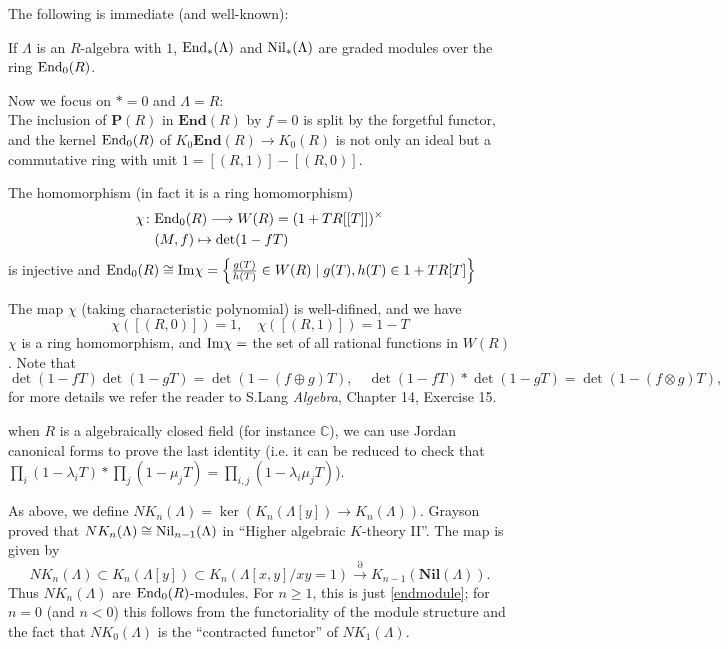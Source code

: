 The following is immediate (and well-known):
\begin{prop}\label{endmodule}
	If  $\Lambda$ is an $R$-algebra with $1$, $\mathrm{End}_*(\Lambda)$ and
$\mathrm{Nil}_*(\Lambda)$ are graded modules over the ring $\mathrm{End}_0 (R)$.
\end{prop}
Now we focus on $*=0$ and $\Lambda =R$:\\

The inclusion of $\mathbf{P}(R)$ in $\mathbf{End}(R)$ by $f = 0$ is split by the forgetful functor, and the kernel $\mathrm{End}_0 (R)$ of $K_0\mathbf{End}(R) \longrightarrow K_0 (R)$ is not only an ideal but a commutative ring with unit $1 = [(R,1)] - [(R, 0)]$.

\begin{theorem}[Almkvist]\label{Almkvist}
The homomorphism (in fact it is a ring homomorphism)
\begin{align*}
	\chi \colon&  \mathrm{End}_0(R)\longrightarrow W(R)=(1+TR[[T]])^{\times}\\
     & (M,f) \mapsto \det(1-fT)
\end{align*}
	is injective and $\mathrm{End}_0(R)\cong \mathrm{Im} \chi =\left\{\frac{g(T)}{h(T)}\in W(R)\mid g(T),h(T) \in 1+TR[T]\right\}$
\end{theorem}
The map $\chi$ (taking characteristic polynomial) is well-difined, and we have 
\[\chi([(R,0)])=1, \quad \chi([(R,1)])=1-T\]
$\chi$ is a ring homomorphism, and $\mathrm{Im} \chi =$ the set of all rational functions in $W(R)$. Note that 
\[\det (1-fT)\det(1-gT)=\det(1-(f\oplus g)T),\quad \det (1-fT)*\det(1-gT)=\det(1-(f\otimes g)T),\]
for more details we refer the reader to S.Lang {\em Algebra}, Chapter 14, Exercise 15.
\begin{remark}
	when $R$ is a algebraically closed field (for instance $\mathbb{C}$), we can use Jordan canonical forms to prove the last identity (i.e. it can be reduced to check that $\prod_i (1-\lambda_i T) * \prod_j (1-\mu_j T) =\prod_{i,j} (1-\lambda_i \mu_j T)$).
\end{remark}


\begin{definition}[$NK_*$]
	As above, we define $NK_n(\Lambda)=\ker(K_n(\Lambda[y])\longrightarrow K_n(\Lambda))$. Grayson proved that $NK_n(\Lambda)\cong \mathrm{Nil}_{n-1}(\Lambda)$ in ``Higher algebraic $K$-theory II''. The map is given by 
	\[NK_n(\Lambda) \subset K_n(\Lambda[y]) \subset K_n(\Lambda[x,y]/xy=1)\overset{\partial}\longrightarrow K_{n-1}(\mathbf{Nil}(\Lambda)).\]
	Thus $NK_n(\Lambda)$ are $\mathrm{End}_0(R)$-modules. For $n \geq 1$, this is just \ref{endmodule}; for $n = 0$ (and $n < 0$) this follows from the functoriality of the module structure and the fact that $NK_0(\Lambda)$ is the ``contracted functor'' of $NK_1(\Lambda)$.
\end{definition}

